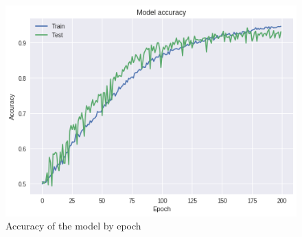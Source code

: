 \documentclass[a4paper]{article}
\begin{document}
%
\begin{figure}[h!]
	\centering
	\includegraphics[scale=.6]{VGGAccu_of.png}
	\caption{Accuracy of the model by epoch}
	\label{fig:vggacc}
\end{figure}
\end{document}
